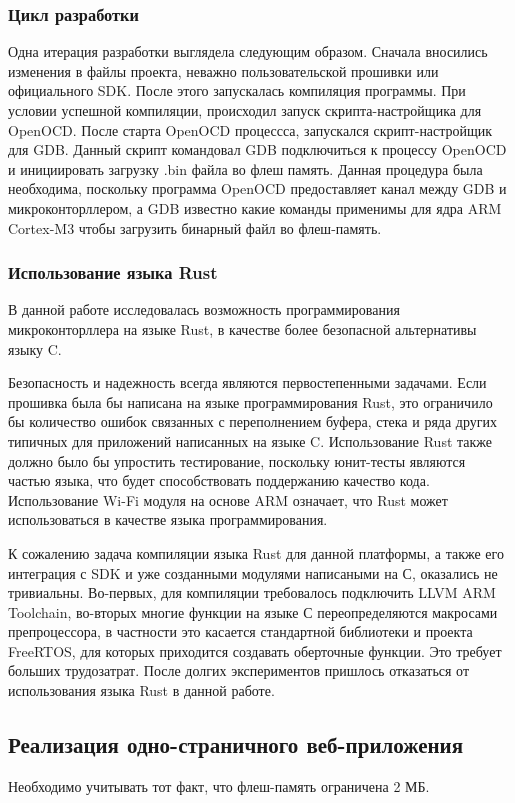 \subsubsection{Цикл разработки}
Одна итерация разработки выглядела следующим образом. Сначала вносились изменения в файлы проекта, неважно пользовательской прошивки или официального SDK. После этого запускалась компиляция программы. При условии успешной компиляции, происходил запуск скрипта-настройщика для OpenOCD. После старта OpenOCD процессса, запускался скрипт-настройщик для GDB. Данный скрипт командовал GDB подключиться к процессу OpenOCD и инициировать загрузку .bin файла во флеш память. Данная процедура была необходима, поскольку программа OpenOCD предоставляет канал между GDB и микроконторллером, а GDB известно какие команды применимы для ядра ARM Cortex-M3 чтобы загрузить бинарный файл во флеш-память. 

\subsubsection{Использование языка Rust}
В данной работе исследовалась возможность программирования микроконторллера на языке Rust, в качестве более безопасной альтернативы языку C.

Безопасность и надежность всегда являются первостепенными задачами. Если прошивка была бы написана на языке программирования Rust, это ограничило бы количество ошибок связанных с переполнением буфера, стека и ряда других типичных для приложений написанных на языке C. Использование Rust также должно было бы упростить тестирование, поскольку юнит-тесты являются частью языка, что будет способствовать поддержанию качество кода. Использование Wi-Fi модуля на основе ARM означает, что Rust может использоваться в качестве языка программирования.

К сожалению задача компиляции языка Rust для данной платформы, а также его интеграция с SDK и уже созданными модулями написаными на С, оказались не тривиальны. Во-первых, для компиляции требовалось подключить LLVM ARM Toolchain, во-вторых многие функции на языке С переопределяются макросами препроцессора, в частности это касается стандартной библиотеки и проекта FreeRTOS, для которых приходится создавать оберточные функции. Это требует больших трудозатрат. После долгих экспериментов пришлось отказаться от использования языка Rust в данной работе.



\subsection{Реализация одно-страничного веб-приложения}
Необходимо учитывать тот факт, что флеш-память ограничена 2 МБ.

